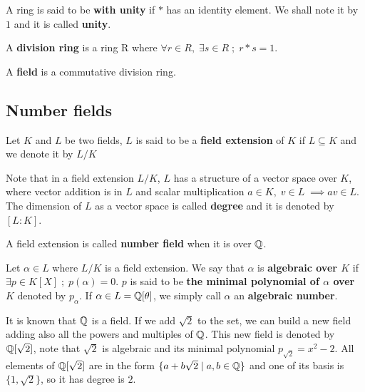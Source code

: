 \documentclass[a4paper,12pt]{article}
\begin{document}
\begin{definition}
  A ring is said to be \textbf{with unity} if $*$ has an identity element. We
  shall note it by $1$ and it is called \textbf{unity}.

\end{definition}

\begin{definition}
  A \textbf{division ring} is a ring R where $\forall r \in R, \; \exists s \in R \; ; \; r*s = 1$.
\end{definition}

\begin{definition}
  A \textbf{field} is a commutative division ring.
\end{definition}

\subsection{Number fields}
\label{sec:orgc4ee3c7}

   \begin{definition}
  Let $K$ and $L$ be two fields, $L$ is said to be a \textbf{field extension} of
  $K$ if $L \subseteq K$ and we denote it by $L/K$
\end{definition}

Note that in a field extension \(L/K\), \(L\) has a structure of a vector space over
\(K\), where vector addition is in \(L\) and scalar multiplication \(a \in K, \; v \in L
   \; \implies av \in L\). The dimension of \(L\) as a vector space is called
\textbf{degree} and it is denoted by \([L:K]\).

\begin{definition}
  A field extension is called \textbf{number field} when it is over $\mathbb{Q}$.
\end{definition}

\begin{definition}
  Let $\alpha \in L$ where $L/K$ is a field extension. We say that $\alpha$ is
  \textbf{algebraic over $K$} if $\exists p \in K[X] \;;\; p(\alpha) = 0$. $p$ is said to be
  \textbf{the minimal polynomial of $\alpha$ over $K$} denoted by $p_\alpha$. If $\alpha \in L =
  \mathbb{Q}[\theta]$, we simply call $\alpha$ an \textbf{algebraic number}.
\end{definition}

\begin{example}
  It is known that $\mathbb{Q}$ is a field. If we add $\sqrt{2}$ to the set, we
  can build a new field adding also all the powers and multiples of
  $\mathbb{Q}$. This new field is denoted by $\mathbb{Q}[\sqrt{2}]$, note that
  $\sqrt{2}$ is algebraic and its minimal polynomial $p_{\sqrt{2}} = x^2-2$. All
  elements of $\mathbb{Q}[\sqrt{2}]$ are in the form $\{a+b\sqrt{2} \;|\; a,b \in
  \mathbb{Q}\}$ and one of its basis is $\{1, \sqrt{2}\}$, so it has degree is
  $2$.
\end{example}
\end{document}
